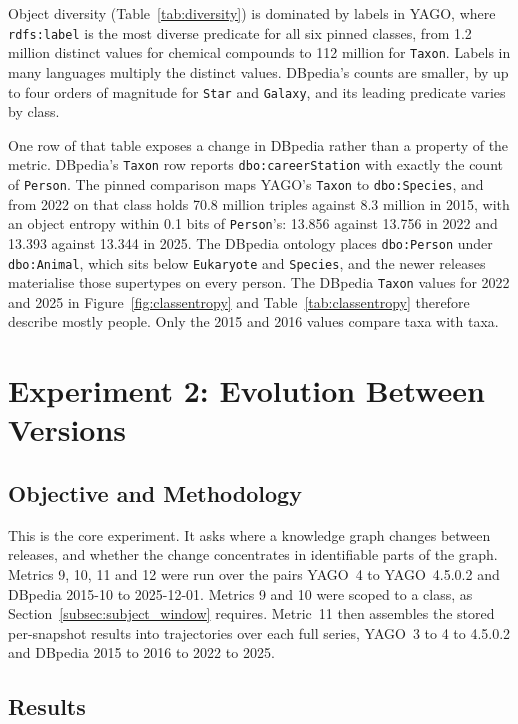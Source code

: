 Object diversity (Table~\ref{tab:diversity}) is dominated by labels in YAGO,
where \texttt{rdfs:label} is the most diverse predicate for all six pinned
classes, from 1.2 million distinct values for chemical compounds to 112 million
for \texttt{Taxon}. Labels in many languages multiply the distinct values. DBpedia's
counts are smaller, by up to four orders of magnitude for \texttt{Star} and
\texttt{Galaxy}, and its leading predicate varies by class.

One row of that table exposes a change in DBpedia rather than a property of the
metric. DBpedia's \texttt{Taxon} row reports \texttt{dbo:careerStation} with
exactly the count of \texttt{Person}. The pinned comparison maps YAGO's
\texttt{Taxon} to \texttt{dbo:Species}, and from 2022 on that class holds 70.8
million triples against 8.3 million in 2015, with an object entropy within 0.1
bits of \texttt{Person}'s: 13.856 against 13.756 in 2022 and 13.393 against
13.344 in 2025. The DBpedia ontology places \texttt{dbo:Person} under
\texttt{dbo:Animal}, which sits below \texttt{Eukaryote} and \texttt{Species},
and the newer releases materialise those supertypes on every person. The DBpedia
\texttt{Taxon} values for 2022 and 2025 in Figure~\ref{fig:classentropy} and
Table~\ref{tab:classentropy} therefore describe mostly people. Only the 2015 and
2016 values compare taxa with taxa.

\section{Experiment 2: Evolution Between Versions}
\label{sec:exp2}

\subsection{Objective and Methodology}

This is the core experiment. It asks where a knowledge graph changes between
releases, and whether the change concentrates in identifiable parts of the graph.
Metrics 9, 10, 11 and 12 were run over the pairs YAGO~4 to YAGO~4.5.0.2 and
DBpedia 2015-10 to 2025-12-01. Metrics 9 and 10 were scoped to a class, as
Section~\ref{subsec:subject_window} requires. Metric~11 then assembles the stored
per-snapshot results into trajectories over each full series, YAGO~3 to 4 to
4.5.0.2 and DBpedia 2015 to 2016 to 2022 to 2025.

\subsection{Results}

